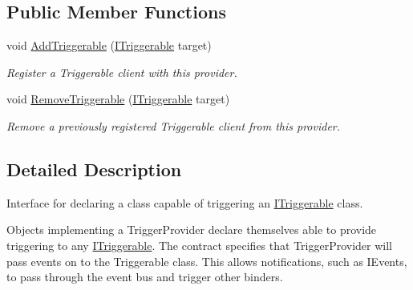 \subsection*{Public Member Functions}
\begin{DoxyCompactItemize}
\item 
\hypertarget{interfacestrange_1_1extensions_1_1dispatcher_1_1api_1_1_i_trigger_provider_aaf6162c2f0f00d6b42076f7b2397828a}{void \hyperlink{interfacestrange_1_1extensions_1_1dispatcher_1_1api_1_1_i_trigger_provider_aaf6162c2f0f00d6b42076f7b2397828a}{Add\-Triggerable} (\hyperlink{interfacestrange_1_1extensions_1_1dispatcher_1_1api_1_1_i_triggerable}{I\-Triggerable} target)}\label{interfacestrange_1_1extensions_1_1dispatcher_1_1api_1_1_i_trigger_provider_aaf6162c2f0f00d6b42076f7b2397828a}

\begin{DoxyCompactList}\small\item\em Register a Triggerable client with this provider. \end{DoxyCompactList}\item 
\hypertarget{interfacestrange_1_1extensions_1_1dispatcher_1_1api_1_1_i_trigger_provider_ad582237786b479b01b15b42e4751a0de}{void \hyperlink{interfacestrange_1_1extensions_1_1dispatcher_1_1api_1_1_i_trigger_provider_ad582237786b479b01b15b42e4751a0de}{Remove\-Triggerable} (\hyperlink{interfacestrange_1_1extensions_1_1dispatcher_1_1api_1_1_i_triggerable}{I\-Triggerable} target)}\label{interfacestrange_1_1extensions_1_1dispatcher_1_1api_1_1_i_trigger_provider_ad582237786b479b01b15b42e4751a0de}

\begin{DoxyCompactList}\small\item\em Remove a previously registered Triggerable client from this provider. \end{DoxyCompactList}\end{DoxyCompactItemize}


\subsection{Detailed Description}
Interface for declaring a class capable of triggering an \hyperlink{interfacestrange_1_1extensions_1_1dispatcher_1_1api_1_1_i_triggerable}{I\-Triggerable} class. 

Objects implementing a Trigger\-Provider declare themselves able to provide triggering to any \hyperlink{interfacestrange_1_1extensions_1_1dispatcher_1_1api_1_1_i_triggerable}{I\-Triggerable}. The contract specifies that Trigger\-Provider will pass events on to the Triggerable class. This allows notifications, such as I\-Events, to pass through the event bus and trigger other binders.


